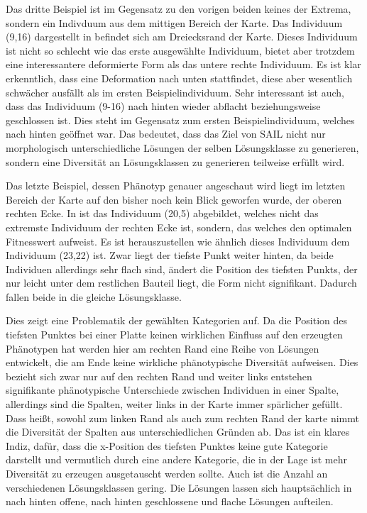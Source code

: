 Das dritte Beispiel ist im Gegensatz zu den vorigen beiden keines der Extrema, sondern ein Indivduum aus dem mittigen Bereich der Karte.
Das Individuum (9,16) dargestellt in  befindet sich am Dreiecksrand der Karte.
Dieses Individuum ist nicht so schlecht wie das erste ausgewählte Individuum, bietet aber trotzdem eine interessantere deformierte Form als das untere rechte Individuum.
Es ist klar erkenntlich, dass eine Deformation nach unten stattfindet, diese aber wesentlich schwächer ausfällt als im ersten Beispielindividuum.
Sehr interessant ist auch, dass das Individuum (9-16) nach hinten wieder abflacht beziehungsweise geschlossen ist.
Dies steht im Gegensatz zum ersten Beispielindividuum, welches nach hinten geöffnet war.
Das bedeutet, dass das Ziel von SAIL nicht nur morphologisch unterschiedliche Lösungen der selben Lösungsklasse zu generieren, sondern eine Diversität an Lösungsklassen zu generieren teilweise erfüllt wird.


Das letzte Beispiel, dessen Phänotyp genauer angeschaut wird liegt im letzten Bereich der Karte auf den bisher noch kein Blick geworfen wurde, der oberen rechten Ecke.
In  ist das Individuum (20,5) abgebildet, welches nicht das extremste Individuum der rechten Ecke ist, sondern, das welches den optimalen Fitnesswert aufweist.
Es ist herauszustellen wie ähnlich dieses Individuum dem Individuum (23,22) ist.
Zwar liegt der tiefste Punkt weiter hinten, da beide Individuen allerdings sehr flach sind, ändert die Position des tiefsten Punkts, der nur leicht unter dem restlichen Bauteil liegt, die Form nicht signifikant.
Dadurch fallen beide in die gleiche Lösungsklasse.

Dies zeigt eine Problematik der gewählten Kategorien auf.
Da die Position des tiefsten Punktes bei einer Platte keinen wirklichen Einfluss auf den erzeugten Phänotypen hat werden hier am rechten Rand eine Reihe von Lösungen entwickelt, die am Ende keine wirkliche phänotypische Diversität aufweisen.
Dies bezieht sich zwar nur auf den rechten Rand und weiter links entstehen signifikante phänotypische Unterschiede zwischen Individuen in einer Spalte, allerdings sind die Spalten, weiter links in der Karte immer spärlicher gefüllt.
Dass heißt, sowohl zum linken Rand als auch zum rechten Rand der karte nimmt die Diversität der Spalten aus unterschiedlichen Gründen ab.
Das ist ein klares Indiz, dafür, dass die x-Position des tiefsten Punktes keine gute Kategorie darstellt und vermutlich durch eine andere Kategorie, die in der Lage ist mehr Diversität zu erzeugen ausgetauscht werden sollte.
Auch ist die Anzahl an verschiedenen Lösungsklassen gering. Die Lösungen lassen sich hauptsächlich in nach hinten offene, nach hinten geschlossene und flache Lösungen aufteilen.


